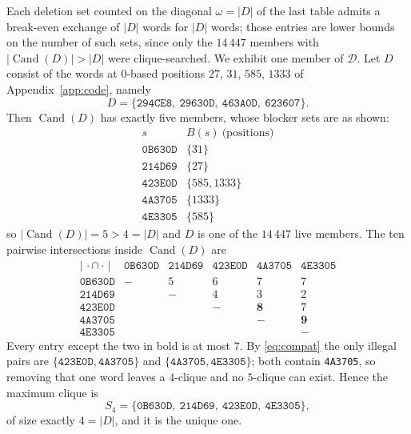 \documentclass[11pt]{amsart}
\theoremstyle{remark}
\DeclareMathOperator{\Cand}{Cand}
\begin{document}
Each deletion set counted on the diagonal $\omega=|D|$ of the last table admits a break-even
exchange of $|D|$ words for $|D|$ words; those entries are lower bounds on the number of such
sets, since only the $14\,447$ members with $|\Cand(D)|>|D|$ were clique-searched. We exhibit
one member of $\mathcal D$. Let $D$ consist of the words at $0$-based
positions $27$, $31$, $585$, $1333$ of Appendix~\ref{app:code}, namely
\[
 D=\{\texttt{294CE8},\ \texttt{29630D},\ \texttt{463A0D},\ \texttt{623607}\}.
\]
Then $\Cand(D)$ has exactly five members, whose blocker sets are as shown:
\[
\begin{array}{l|l}
 s & B(s)\ \text{(positions)}\\\hline
 \texttt{0B630D} & \{31\}\\
 \texttt{214D69} & \{27\}\\
 \texttt{423E0D} & \{585,1333\}\\
 \texttt{4A3705} & \{1333\}\\
 \texttt{4E3305} & \{585\}
\end{array}
\]
so $|\Cand(D)|=5>4=|D|$ and $D$ is one of the $14\,447$ live members. The ten pairwise
intersections inside $\Cand(D)$ are
\[
\begin{array}{l|rrrrr}
 |\,\cdot\cap\cdot\,| & \texttt{0B630D} & \texttt{214D69} & \texttt{423E0D} & \texttt{4A3705} & \texttt{4E3305}\\\hline
 \texttt{0B630D} & - & 5 & 6 & 7 & 7\\
 \texttt{214D69} &   & - & 4 & 3 & 2\\
 \texttt{423E0D} &   &   & - & \mathbf{8} & 7\\
 \texttt{4A3705} &   &   &   & - & \mathbf{9}\\
 \texttt{4E3305} &   &   &   &   & -
\end{array}
\]
Every entry except the two in bold is at most $7$. By \eqref{eq:compat} the only illegal pairs
are $\{\texttt{423E0D},\texttt{4A3705}\}$ and $\{\texttt{4A3705},\texttt{4E3305}\}$; both
contain \texttt{4A3705}, so removing that one word leaves a $4$-clique and no $5$-clique can
exist. Hence the maximum clique is
\[
 S_4=\{\texttt{0B630D},\ \texttt{214D69},\ \texttt{423E0D},\ \texttt{4E3305}\},
\]
of size exactly $4=|D|$, and it is the unique one.
\end{document}
